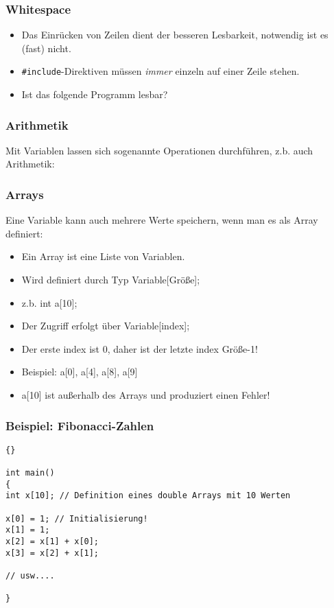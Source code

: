 \begin{frame}[fragile]
\frametitle{Whitespace}
\begin{itemize}
\item Das Einrücken von Zeilen dient der besseren Lesbarkeit,
  notwendig ist es (fast) nicht.
\item \lstinline{#include}-Direktiven müssen \textsl{immer} einzeln
  auf einer Zeile stehen.
\item Ist das folgende Programm lesbar?

\end{itemize}
\end{frame}

\begin{frame}[fragile]
\frametitle{Arithmetik}
Mit Variablen lassen sich sogenannte Operationen durchführen, z.b. auch Arithmetik:

\end{frame}

\begin{frame}[fragile]
\frametitle{Arrays}
Eine Variable kann auch mehrere Werte speichern,
wenn man es als Array definiert:
\begin{itemize}
\item Ein Array ist eine Liste von Variablen.
\item Wird definiert durch Typ Variable[Grö\ss e];
\item z.b. int a[10];
\item Der Zugriff erfolgt über Variable[index];
\item Der erste index ist 0, daher ist der letzte index Grö\ss e-1!
\item Beispiel: a[0], a[4], a[8], a[9]
\item a[10] ist au\ss erhalb des Arrays und produziert einen Fehler!
\end{itemize}
\end{frame}

\begin{frame}[fragile]
\frametitle{Beispiel: Fibonacci-Zahlen}
{\scriptsize\begin{lstlisting}{}

int main()
{
int x[10]; // Definition eines double Arrays mit 10 Werten

x[0] = 1; // Initialisierung!
x[1] = 1;
x[2] = x[1] + x[0];
x[3] = x[2] + x[1];

// usw....

}
\end{lstlisting}}
\end{frame}

